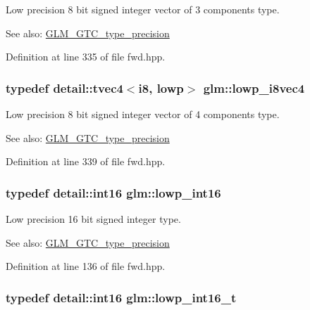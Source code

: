 Low precision 8 bit signed integer vector of 3 components type. \begin{Desc}
\item[See also:]\hyperlink{group__gtc__type__precision}{GLM\_\-GTC\_\-type\_\-precision} \end{Desc}


Definition at line 335 of file fwd.hpp.\hypertarget{group__gtc__type__precision_g095202095a1fefbdae4a974c3b750223}{
\subsubsection[lowp\_\-i8vec4]{\setlength{\rightskip}{0pt plus 5cm}typedef detail::tvec4$<$i8, lowp$>$ {\bf glm::lowp\_\-i8vec4}}}
\label{group__gtc__type__precision_g095202095a1fefbdae4a974c3b750223}


Low precision 8 bit signed integer vector of 4 components type. \begin{Desc}
\item[See also:]\hyperlink{group__gtc__type__precision}{GLM\_\-GTC\_\-type\_\-precision} \end{Desc}


Definition at line 339 of file fwd.hpp.\hypertarget{group__gtc__type__precision_g71fc0c399fa4780507748b643733f153}{
\subsubsection[lowp\_\-int16]{\setlength{\rightskip}{0pt plus 5cm}typedef detail::int16 {\bf glm::lowp\_\-int16}}}
\label{group__gtc__type__precision_g71fc0c399fa4780507748b643733f153}


Low precision 16 bit signed integer type. \begin{Desc}
\item[See also:]\hyperlink{group__gtc__type__precision}{GLM\_\-GTC\_\-type\_\-precision} \end{Desc}


Definition at line 136 of file fwd.hpp.\hypertarget{group__gtc__type__precision_ge34c3d53c4c1434fc9f26538b0185667}{
\subsubsection[lowp\_\-int16\_\-t]{\setlength{\rightskip}{0pt plus 5cm}typedef detail::int16 {\bf glm::lowp\_\-int16\_\-t}}}
\label{group__gtc__type__precision_ge34c3d53c4c1434fc9f26538b0185667}


